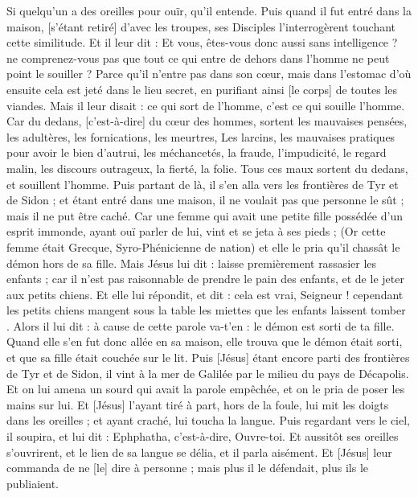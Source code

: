 \begin{multicols}{2}
Si quelqu'un a des oreilles pour ouïr, qu'il entende.
Puis quand il fut entré dans la maison, [s'étant retiré] d'avec les troupes, ses Disciples l'interrogèrent touchant cette similitude.
Et il leur dit : Et vous, êtes-vous donc aussi sans intelligence ? ne comprenez-vous pas que tout ce qui entre de dehors dans l'homme ne peut point le souiller ?
Parce qu'il n'entre pas dans son cœur, mais dans l'estomac d'où ensuite cela est jeté dans le lieu secret, en purifiant ainsi [le corps] de toutes les viandes.
Mais il leur disait : ce qui sort de l'homme, c'est ce qui souille l'homme.
Car du dedans, [c'est-à-dire] du cœur des hommes, sortent les mauvaises pensées, les adultères, les fornications, les meurtres,
Les larcins, les mauvaises pratiques pour avoir le bien d'autrui, les méchancetés, la fraude, l'impudicité, le regard malin, les discours outrageux, la fierté, la folie.
Tous ces maux sortent du dedans, et souillent l'homme.
Puis partant de là, il s'en alla vers les frontières de Tyr et de Sidon ; et étant entré dans une maison, il ne voulait pas que personne le sût ; mais il ne put être caché.
Car une femme qui avait une petite fille possédée d'un esprit immonde, ayant ouï parler de lui, vint et se jeta à ses pieds ;
(Or cette femme était Grecque, Syro-Phénicienne de nation) et elle le pria qu'il chassât le démon hors de sa fille.
Mais Jésus lui dit : laisse premièrement rassasier les enfants ; car il n'est pas raisonnable de prendre le pain des enfants, et de le jeter aux petits chiens.
Et elle lui répondit, et dit : cela est vrai, Seigneur ! cependant les petits chiens mangent sous la table les miettes que les enfants laissent tomber .
Alors il lui dit : à cause de cette parole va-t'en : le démon est sorti de ta fille.
Quand elle s'en fut donc allée en sa maison, elle trouva que le démon était sorti, et que sa fille était couchée sur le lit.
Puis [Jésus] étant encore parti des frontières de Tyr et de Sidon, il vint à la mer de Galilée par le milieu du pays de Décapolis.
Et on lui amena un sourd qui avait la parole empêchée, et on le pria de poser les mains sur lui.
Et [Jésus] l'ayant tiré à part, hors de la foule, lui mit les doigts dans les oreilles ; et ayant craché, lui toucha la langue.
Puis regardant vers le ciel, il soupira, et lui dit : Ephphatha, c'est-à-dire, Ouvre-toi.
Et aussitôt ses oreilles s'ouvrirent, et le lien de sa langue se délia, et il parla aisément.
Et [Jésus] leur commanda de ne [le] dire à personne ; mais plus il le défendait, plus ils le publiaient.

\end{multicols}

